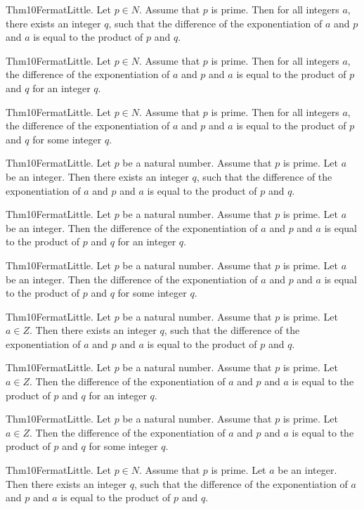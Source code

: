 \documentclass{article}
\begin{document}
Thm10FermatLittle. Let $p \in N$. Assume that $p$ is prime. Then for all integers $a$, there exists an integer $q$, such that the difference of the exponentiation of $a$ and $p$ and $a$ is equal to the product of $p$ and $q$.

Thm10FermatLittle. Let $p \in N$. Assume that $p$ is prime. Then for all integers $a$, the difference of the exponentiation of $a$ and $p$ and $a$ is equal to the product of $p$ and $q$ for an integer $q$.

Thm10FermatLittle. Let $p \in N$. Assume that $p$ is prime. Then for all integers $a$, the difference of the exponentiation of $a$ and $p$ and $a$ is equal to the product of $p$ and $q$ for some integer $q$.

Thm10FermatLittle. Let $p$ be a natural number. Assume that $p$ is prime. Let $a$ be an integer. Then there exists an integer $q$, such that the difference of the exponentiation of $a$ and $p$ and $a$ is equal to the product of $p$ and $q$.

Thm10FermatLittle. Let $p$ be a natural number. Assume that $p$ is prime. Let $a$ be an integer. Then the difference of the exponentiation of $a$ and $p$ and $a$ is equal to the product of $p$ and $q$ for an integer $q$.

Thm10FermatLittle. Let $p$ be a natural number. Assume that $p$ is prime. Let $a$ be an integer. Then the difference of the exponentiation of $a$ and $p$ and $a$ is equal to the product of $p$ and $q$ for some integer $q$.

Thm10FermatLittle. Let $p$ be a natural number. Assume that $p$ is prime. Let $a \in Z$. Then there exists an integer $q$, such that the difference of the exponentiation of $a$ and $p$ and $a$ is equal to the product of $p$ and $q$.

Thm10FermatLittle. Let $p$ be a natural number. Assume that $p$ is prime. Let $a \in Z$. Then the difference of the exponentiation of $a$ and $p$ and $a$ is equal to the product of $p$ and $q$ for an integer $q$.

Thm10FermatLittle. Let $p$ be a natural number. Assume that $p$ is prime. Let $a \in Z$. Then the difference of the exponentiation of $a$ and $p$ and $a$ is equal to the product of $p$ and $q$ for some integer $q$.

Thm10FermatLittle. Let $p \in N$. Assume that $p$ is prime. Let $a$ be an integer. Then there exists an integer $q$, such that the difference of the exponentiation of $a$ and $p$ and $a$ is equal to the product of $p$ and $q$.
\end{document}

